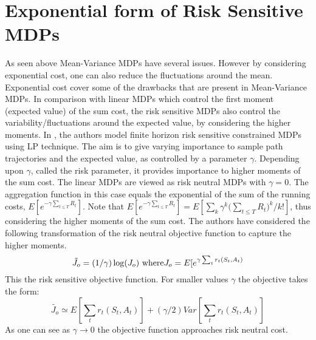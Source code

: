\documentclass[12pt,a4paper,oneside]{report}
\begin{document}
\section{Exponential form of Risk Sensitive MDPs}
As seen above Mean-Variance MDPs have several issues. However by considering exponential cost, one can also reduce the fluctuations around the mean. Exponential cost cover some of the drawbacks that are present in Mean-Variance MDPs.
In comparison with linear MDPs which control the first moment (expected value) of the sum cost, the risk sensitive MDPs also control the variability/fluctuations around the expected value, by considering the higher moments. In \cite{kumar2015finite}, the authors model finite horizon risk sensitive constrained MDPs using LP technique.  The aim is to give varying importance to sample path trajectories and the expected value, as controlled by a parameter $\gamma$. Depending upon $\gamma$, called the risk parameter, it provides importance to higher moments of the sum cost. The linear MDPs are viewed as risk neutral MDPs with $\gamma=0$. The aggregation function in this case equals the exponential of the sum of the running costs, $E[e^{-\gamma {\sum_{t\leq T}R_t}} ]$. Note that $E[e^{-\gamma {\sum_{t\leq T}R_t}} ]= E[{\sum_k \gamma ^k {(\sum_{t\leq T}{R_t}})^{k}}/{k!}]$, thus considering the higher moments of the sum cost.
The authors have considered the following transformation of the risk neutral objective function to capture the higher moments.
\begin{equation*}
\tilde{J_o} = (1/\gamma)\log(J_o) \text{     where}\\
J_o = E[e^{\gamma \sum_t r_t(S_t,A_t)} 
\end{equation*}
This the risk sensitive objective function. For smaller values $\gamma$ the objective takes the form:
\begin{equation}
\tilde{J_o} \simeq E[ \sum_t r_t(S_t,A_t)] + (\gamma /2)Var[\sum_t r_t(S_t,A_t)] 
\end{equation} 
As one can see as $\gamma \rightarrow 0$ the objective function approaches risk neutral cost. 
\end{document}
